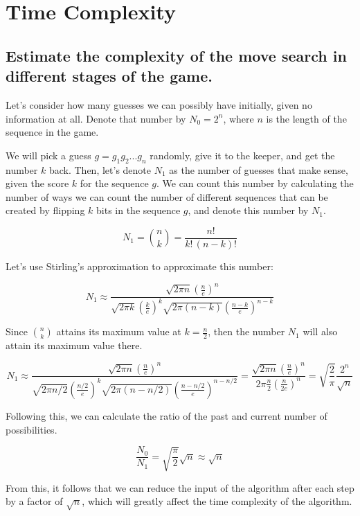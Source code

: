 %
\section{Time Complexity}
%

\subsection*{Estimate the complexity of the move search in different stages of the game.}

Let's consider how many guesses we can possibly have initially, given no information at all. Denote that number by $N_0 = 2^n$, where $n$ is the length of the sequence in the game.

We will pick a guess $g = g_1 g_2 ... g_n$ randomly, give it to the keeper, and get the number $k$ back. Then, let's denote $N_1$ as the number of guesses that make sense, given the score $k$ for the sequence $g$. We can count this number by calculating the number of ways we can count the number of different sequences that can be created by flipping $k$ bits in the sequence $g$, and denote this number by $N_1$.

\[
N_1 = \binom{n}{k} = \frac{n!}{k!\,(n-k)!}
\]

Let's use Stirling's approximation to approximate this number:

\[
N_1 \approx \frac{\sqrt{2\pi n} {(\frac{n}{e})}^n}{\sqrt{2\pi k} {(\frac{k}{e})}^k \sqrt{2\pi (n-k)} {(\frac{n-k}{e})}^{n-k}}
\]


Since $\binom{n}{k}$ attains its maximum value at $k = \frac{n}{2}$, then the number $N_1$ will also attain its maximum value there.

\[
N_1 \approx \frac{\sqrt{2\pi n} {(\frac{n}{e})}^n}{\sqrt{2\pi n/2} {(\frac{n/2}{e})}^k \sqrt{2\pi (n-n/2)} {(\frac{n-n/2}{e})}^{n-n/2}} = \frac{\sqrt{2\pi n} {(\frac{n}{e})}^n}{2\pi \frac{n}{2} {(\frac{n}{2e})}^n} = \sqrt{\frac{2}{\pi}} \frac{2^n}{\sqrt{n}}
\]

Following this, we can calculate the ratio of the past and current number of possibilities.

\[
\frac{N_0}{N_1} = \sqrt{\frac{\pi}{2}} \sqrt{n} \approx \sqrt{n}
\]

From this, it follows that we can reduce the input of the algorithm after each step by a factor of $\sqrt{n}$, which will greatly affect the time complexity of the algorithm.
